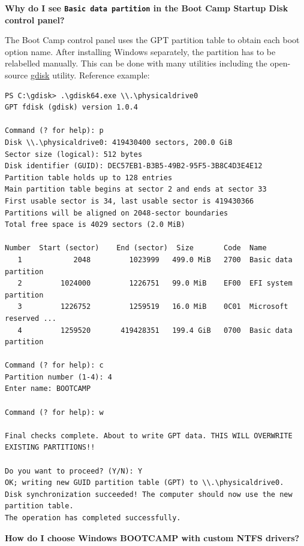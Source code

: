 \documentclass[]{article}
\begin{document}
  \textbf{Why do I see \texttt{Basic data partition} in the Boot Camp Startup Disk control panel?}

  The Boot Camp control panel uses the GPT partition table to obtain each boot option name.
  After installing Windows separately, the partition has to be relabelled manually.
  This can be done with many utilities including the open-source
  \href{https://sourceforge.net/projects/gptfdisk}{gdisk} utility. Reference example:

\begin{lstlisting}[caption=Relabeling Windows volume, label=relabel, style=ocbash]
PS C:\gdisk> .\gdisk64.exe \\.\physicaldrive0
GPT fdisk (gdisk) version 1.0.4

Command (? for help): p
Disk \\.\physicaldrive0: 419430400 sectors, 200.0 GiB
Sector size (logical): 512 bytes
Disk identifier (GUID): DEC57EB1-B3B5-49B2-95F5-3B8C4D3E4E12
Partition table holds up to 128 entries
Main partition table begins at sector 2 and ends at sector 33
First usable sector is 34, last usable sector is 419430366
Partitions will be aligned on 2048-sector boundaries
Total free space is 4029 sectors (2.0 MiB)

Number  Start (sector)    End (sector)  Size       Code  Name
   1            2048         1023999   499.0 MiB   2700  Basic data partition
   2         1024000         1226751   99.0 MiB    EF00  EFI system partition
   3         1226752         1259519   16.0 MiB    0C01  Microsoft reserved ...
   4         1259520       419428351   199.4 GiB   0700  Basic data partition

Command (? for help): c
Partition number (1-4): 4
Enter name: BOOTCAMP

Command (? for help): w

Final checks complete. About to write GPT data. THIS WILL OVERWRITE EXISTING PARTITIONS!!

Do you want to proceed? (Y/N): Y
OK; writing new GUID partition table (GPT) to \\.\physicaldrive0.
Disk synchronization succeeded! The computer should now use the new partition table.
The operation has completed successfully.
\end{lstlisting}


  \textbf{How do I choose Windows BOOTCAMP with custom NTFS drivers?}
\end{document}

